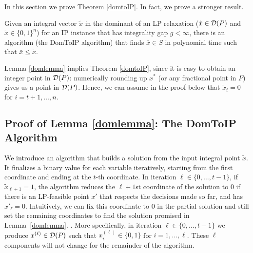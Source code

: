 In this section we prove Theorem \ref{domtoIP}. In fact, we prove a stronger result. 
\begin{lemma}\label{domlemma}
	Given an integral vector $\tilde{x}$ in the dominant of an LP relaxation ($\tilde{x}\in \operatorname{\mathcal{D}}(P)$ and $\tilde{x}\in \{0,1\}^n$) for an IP instance that has integrality gap $g < \infty$, there is an algorithm (the DomToIP algorithm) that finds $\bar{x}\in S$ in polynomial time such that $\bar{x}\leq \tilde{x}$.\end{lemma}
Lemma \ref{domlemma} implies Theorem \ref{domtoIP}, since it is easy to obtain an integer point in $\operatorname{\mathcal{D}}(P)$: numerically rounding up $x^*$ (or any fractional point in $P$) gives us a point in $\operatorname{\mathcal{D}}(P)$.
Hence, we can assume in the proof below that $\tilde{x}_i= 0$ for $i=t+1,\ldots,n$. 
\subsection{Proof of Lemma \ref{domlemma}: The DomToIP Algorithm}

We introduce an algorithm that builds a solution from the input integral point $\tilde{x}$. It finalizes a binary value for each variable iteratively, starting from the first coordinate and ending at the $t$-th coordinate.
In iteration $\ell\in \{0,\ldots,t-1\}$, if $\tilde{x}_{\ell+1}=1$, the algorithm reduces the $\ell + 1$st coordinate of the solution to $0$ if there is an LP-feasible point $x'$ that respects the decisions made so far, and has $x'_{\ell}=0$. Intuitively, we can fix this coordinate to $0$ in the partial solution and still set the remaining coordinates to find the solution promised in Lemma~\ref{domlemma}.
.
More specifically, in iteration $\ell\in \{0,\ldots,t-1\}$ we produce $x^{(\ell)}\in \operatorname{\mathcal{D}}(P)$ such that $x^{(\ell)}_i\in \{0,1\}$ for $i=1,\ldots,\ell$. These $\ell$ components will not change for the remainder of the algorithm.

